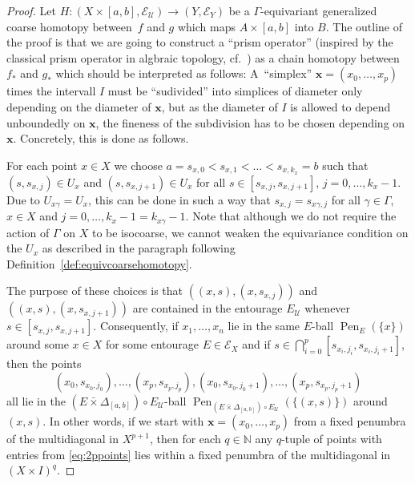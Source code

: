 \documentclass[pdftex]{sigma}
\numberwithin{equation}{section}
\theoremstyle{definition}
\newcommand{\N}{\mathbb{N}}
\newcommand{\cU}{\mathcal{U}}
\newcommand{\coarseStr}{\mathcal{E}}
\newcommand{\Diag}[1][]{{\Delta_{#1}}}
\newcommand{\swapcross}{\mathbin{\bar\times}}
\DeclareMathOperator{\Pen}{Pen}
\begin{document}
\begin{proof}
Let $H\colon (X\times [a,b],\coarseStr_\cU)\to (Y,\coarseStr_Y)$ be a $\Gamma$-equivariant generalized coarse homotopy between~$f$ and $g$ which maps $A\times[a,b]$ into $B$.
The outline of the proof is that we are going to construct a ``prism operator'' (inspired by the classical prism operator in algbraic topology, cf.~\cite[proof of Theorem 2.10]{Hatcher_AT}) as a chain homotopy between $f_*$ and $g_*$ which should be interpreted as follows: A~``simplex'' $\mathbf{x}=(x_0,\dots,x_p)$ times the intervall $I$ must be ``sudivided'' into simplices of diameter only depending on the diameter of $\mathbf{x}$, but as the diameter of $I$ is allowed to depend unboundedly on $\mathbf{x}$, the fineness of the subdivision has to be chosen depending on $\mathbf{x}$.
Concretely, this is done as follows.

For each point $x\in X$ we choose $a=s_{x,0}<s_{x,1}<\dots<s_{x,k_x}=b$ such that $(s,s_{x,j})\in U_x$ and $(s,s_{x,j+1})\in U_x$ for all $s\in[s_{x,j},s_{x,j+1}]$, $j=0,\dots,k_x-1$.
Due to $U_{x\gamma}=U_x$, this can be done in such a way that $s_{x,j}=s_{x\gamma,j}$ for all $\gamma\in \Gamma$, $x\in X$ and $j=0,\dots,k_x-1=k_{x\gamma}-1$. Note that although we do not require the action of $\Gamma$ on $X$ to be isocoarse, we cannot weaken the equivariance condition on the $U_x$ as described in the paragraph following Definition~\ref{def:equivcoarsehomotopy}.

The purpose of these choices is that $((x,s),(x,s_{x,j}))$ and $((x,s),(x,s_{x,j+1}))$ are contained in the entourage $E_\cU$ whenever $s\in [s_{x,j},s_{x,j+1}]$. Consequently, if $x_1,\dots,x_n$ lie in the same $E$-ball $\Pen_E(\{x\})$ around some $x\in X$ for some entourage $E\in\coarseStr_X$ and if $s\in\bigcap_{i=0}^p[s_{x_i,j_i},s_{x_i,j_i+1}]$, then the points
\begin{equation}\label{eq:2ppoints}
(x_0,s_{x_0,j_0}),\dots,(x_p,s_{x_p,j_p}),(x_0,s_{x_0,j_0+1}),\dots,(x_p,s_{x_p,j_p+1})
\end{equation}
all lie in the $(E\swapcross\Diag[{[a,b]}])\circ E_\cU$-ball $\Pen_{(E\swapcross\Diag[{[a,b]}])\circ E_\cU}(\{(x,s)\})$ around $(x,s)$.
In other words, if we start with $\mathbf{x}=(x_0,\dots,x_p)$ from a fixed penumbra of the multidiagonal in $X^{p+1}$, then for each $q\in\N$ any $q$-tuple of points with entries from \eqref{eq:2ppoints} lies within a fixed penumbra of the multidiagonal in $(X\times I)^q$.


\end{proof}
\end{document}
